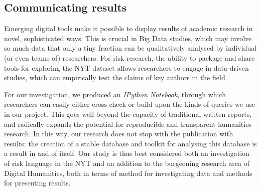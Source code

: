 \subsection{Communicating results}

Emerging digital tools make it possible to display results of academic research in novel, sophisticated ways. This is crucial in Big Data studies, which may involve so much data that only a tiny fraction can be qualitatively analysed by individual (or even teams of) researchers. For risk research, the ability to package and share tools for exploring the NYT dataset allows researchers to engage in data-driven studies, which can empirically test the claims of key authors in the field.

For our investigation, we produced an \emph{IPython Notebook}, through which researchers can easily either cross-check or build upon the kinds of queries we use in our project. This goes well beyond the capacity of traditional written reports, and radically expands the potential for reproducible and transparent humanities research. In this way, our research does not stop with the publication with results: the creation of a stable database and toolkit for analysing this database is a result in and of itself. Our study is thus best considered both an investigation of risk language in the NYT and an addition to the burgeoning research area of Digital Humanities, both in terms of method for investigating data and methods for presenting results.
